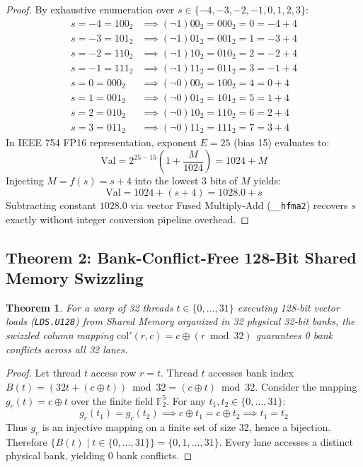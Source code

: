 \documentclass[10pt,twocolumn,letterpaper]{article}
\newtheorem{theorem}{Theorem}
\begin{document}
\begin{proof}
By exhaustive enumeration over $s \in \{-4, -3, -2, -1, 0, 1, 2, 3\}$:
\begin{align*}
s = -4 = 100_2 &\implies (\neg 1)00_2 = 000_2 = 0 = -4 + 4 \\
s = -3 = 101_2 &\implies (\neg 1)01_2 = 001_2 = 1 = -3 + 4 \\
s = -2 = 110_2 &\implies (\neg 1)10_2 = 010_2 = 2 = -2 + 4 \\
s = -1 = 111_2 &\implies (\neg 1)11_2 = 011_2 = 3 = -1 + 4 \\
s = 0 = 000_2 &\implies (\neg 0)00_2 = 100_2 = 4 = 0 + 4 \\
s = 1 = 001_2 &\implies (\neg 0)01_2 = 101_2 = 5 = 1 + 4 \\
s = 2 = 010_2 &\implies (\neg 0)10_2 = 110_2 = 6 = 2 + 4 \\
s = 3 = 011_2 &\implies (\neg 0)11_2 = 111_2 = 7 = 3 + 4
\end{align*}
In IEEE 754 FP16 representation, exponent $E = 25$ (bias 15) evaluates to:
\begin{equation}
\text{Val} = 2^{25 - 15} \left(1 + \frac{M}{1024}\right) = 1024 + M
\end{equation}
Injecting $M = f(s) = s + 4$ into the lowest 3 bits of $M$ yields:
\begin{equation}
\text{Val} = 1024 + (s + 4) = 1028.0 + s
\end{equation}
Subtracting constant $1028.0$ via vector Fused Multiply-Add (\texttt{\_\_hfma2}) recovers $s$ exactly without integer conversion pipeline overhead.
\end{proof}

\subsection{Theorem 2: Bank-Conflict-Free 128-Bit Shared Memory Swizzling}
\begin{theorem}
For a warp of 32 threads $t \in \{0, \dots, 31\}$ executing 128-bit vector loads (\texttt{LDS.U128}) from Shared Memory organized in 32 physical 32-bit banks, the swizzled column mapping $\text{col}'(r, c) = c \oplus (r \bmod 32)$ guarantees 0 bank conflicts across all 32 lanes.
\end{theorem}

\begin{proof}
Let thread $t$ access row $r = t$. Thread $t$ accesses bank index $B(t) = (32 t + (c \oplus t)) \bmod 32 = (c \oplus t) \bmod 32$. Consider the mapping $g_c(t) = c \oplus t$ over the finite field $\mathbb{F}_2^5$. For any $t_1, t_2 \in \{0, \dots, 31\}$:
\begin{equation}
g_c(t_1) = g_c(t_2) \implies c \oplus t_1 = c \oplus t_2 \implies t_1 = t_2
\end{equation}
Thus $g_c$ is an injective mapping on a finite set of size 32, hence a bijection. Therefore $\{B(t) \mid t \in \{0, \dots, 31\}\} = \{0, 1, \dots, 31\}$. Every lane accesses a distinct physical bank, yielding 0 bank conflicts.
\end{proof}
\end{document}
